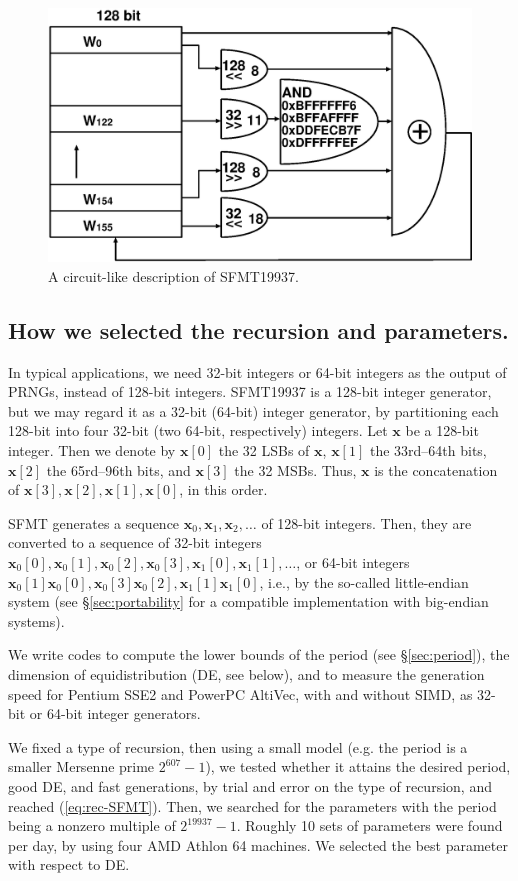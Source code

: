 \documentclass[acmnow]{acmtrans2m}
\def\bx{{{\mathbf x}}}
\begin{document}
\begin{figure}
\begin{center}
\includegraphics[width=0.7\linewidth]{sfmt-b2.eps}
\end{center}
\caption{A circuit-like description of SFMT19937.}
\label{fig:SFMT-B2}
\end{figure}

\subsection{How we selected the recursion and parameters.}
In typical applications, we need 32-bit integers 
or 64-bit integers as the output of PRNGs, instead of 
128-bit integers.
SFMT19937 is a 128-bit integer generator, but 
we may regard it as a 32-bit (64-bit) integer generator, by
partitioning each 128-bit into four 32-bit (two 64-bit, respectively)
integers. 
Let $\bx$ be a 128-bit integer. Then we denote
by 
$\bx[0]$ the 32 LSBs of $\bx$, 
$\bx[1]$ the 33rd--64th bits,
$\bx[2]$ the 65rd--96th bits,
and $\bx[3]$ the 32 MSBs. Thus, $\bx$ is
the concatenation of 
$\bx[3], \bx[2], \bx[1], \bx[0]$, in this order.

SFMT generates a sequence
$\bx_0, \bx_1, \bx_2, \ldots$ of 128-bit integers. 
Then, they are converted to a sequence of 32-bit integers
$\bx_0[0], \bx_0[1], \bx_0[2], \bx_0[3], \bx_1[0], \bx_1[1],\ldots$,
or 64-bit integers
$\bx_0[1]\bx_0[0], \bx_0[3]\bx_0[2], \bx_1[1]\bx_1[0]$,
i.e., by the so-called little-endian system 
(see \S\ref{sec:portability} for a compatible implementation
 with big-endian systems).

We write codes to compute the lower bounds of the period
(see \S\ref{sec:period}),
the dimension of equidistribution (DE, see below),
and to measure the generation speed for Pentium SSE2
and PowerPC AltiVec, with and without SIMD, as 32-bit 
or 64-bit integer generators. 

We fixed a type of recursion,
then using a small model (e.g. the period is a smaller
Mersenne prime $2^{607}-1$), we tested whether it
attains the desired period, good DE, and fast generations,
by trial and error on the type of recursion, 
and reached (\ref{eq:rec-SFMT}).
Then, we searched for the parameters 
with the period being a nonzero multiple of $2^{19937}-1$. 
Roughly 10 sets of parameters were found per day,
by using four AMD Athlon 64 machines. 
We selected the best parameter with respect to DE.
\end{document}
